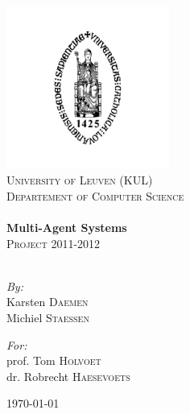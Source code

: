 \begin{titlepage}

\begin{center}


\includegraphics[width=0.40\textwidth]{./figs/logo.png}\\[1cm]    

\textsc{\LARGE University of Leuven (KUL)}\\[0.3cm]

\textsc{\Large Departement of Computer Science}\\[2.0cm]


\HRule \\[0.4cm]
{ \huge \bfseries Multi-Agent Systems}\\[0.2cm]
\textsc{ \Large Project 2011-2012}\\[0.4cm]
\HRule \\[2.5cm]

\begin{minipage}{0.4\textwidth}
\begin{flushleft} \large
\emph{By:}\\
Karsten \textsc{Daemen}\\
Michiel \textsc{Staessen}

\end{flushleft}
\end{minipage}
\begin{minipage}{0.5\textwidth}
\begin{flushright} \large
\emph{For:} \\
prof. Tom \textsc{Holvoet} \\
dr. Robrecht \textsc{Haesevoets}
\end{flushright}
\end{minipage}

\vfill

{\large \today}

\end{center}

\end{titlepage}